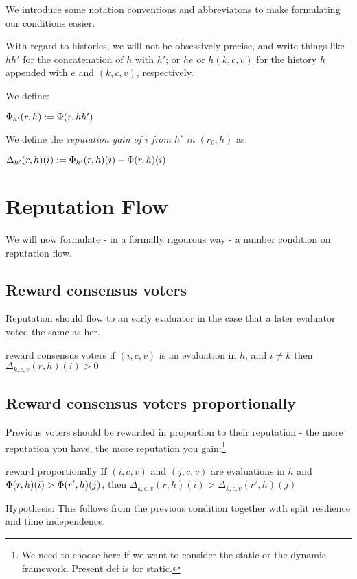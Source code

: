 \documentclass{article}
\begin{document}
We introduce some notation conventions and abbreviatons to make formulating our conditions easier.

With regard to histories, we will not be obsessively precise, and write things like $hh'$ for the concatenation of $h$ with $h'$; or $he$ or $h(k,c,v)$ for the history $h$ appended with $e$ and $(k,c,v)$, respectively. 

We define:
\begin{center}
$\Phi_{h'}(r, h) := \Phi(r, hh')$
\end{center}
We define the {\em reputation gain of $i$ from $h'$ in $(r_0, h)$} as:
\begin{center}
 $ \Delta_{h'}(r, h)(i) :=  \Phi_{h'}(r, h)(i)- \Phi(r, h)(i)$
\end{center}

\section{Reputation Flow}

We will now formulate - in a formally rigourous way - a number condition on reputation flow.


\subsection{Reward consensus voters}

Reputation should flow to an early evaluator in the case that a later evaluator voted the same as her.
\begin{condition}{reward consensus voters}
if $(i, c, v)$ is an evaluation in $h$, and $i \neq k$ then $\Delta_{k, c, v}(r, h)(i) > 0$
\end{condition}

\subsection{Reward consensus voters proportionally}
Previous voters should be rewarded in proportion to their reputation - the more reputation you have, the more reputation you gain:\footnote{We need to choose here if we want to consider the static or the dynamic framework. Present def is for static.}
\begin{condition}{reward proportionally}
If $(i, c, v)$  and $(j, c, v)$ are evaluations in $h$ and $\Phi(r, h)(i) >\Phi(r', h)(j)$, then
$\Delta_{k, c, v}(r, h)(i) > \Delta_{k,c,v}(r', h)(j)$
\end{condition}
Hypothesis: This follows from the previous condition together with split resilience and time independence.
\end{document}
